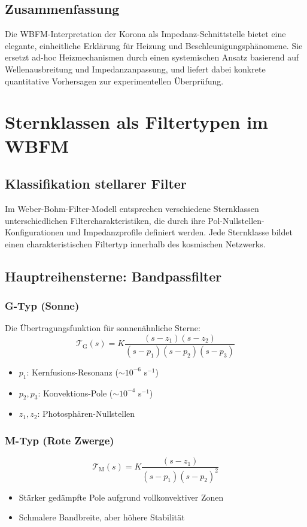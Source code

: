 \section{Zusammenfassung}
Die WBFM-Interpretation der Korona als Impedanz-Schnittstelle bietet eine elegante, einheitliche Erklärung für Heizung und Beschleunigungsphänomene. Sie ersetzt ad-hoc
Heizmechanismen durch einen systemischen Ansatz basierend auf Wellenausbreitung und Impedanzanpassung, und liefert dabei konkrete quantitative Vorhersagen zur experimentellen
Überprüfung.

\chapter{Sternklassen als Filtertypen im WBFM}

\section{Klassifikation stellarer Filter}

Im Weber-Bohm-Filter-Modell entsprechen verschiedene Sternklassen unterschiedlichen Filtercharakteristiken, die durch ihre Pol-Nullstellen-Konfigurationen und Impedanzprofile definiert werden. Jede Sternklasse bildet einen charakteristischen Filtertyp innerhalb des kosmischen Netzwerks.

\section{Hauptreihensterne: Bandpassfilter}

\subsection{G-Typ (Sonne)}
Die Übertragungsfunktion für sonnenähnliche Sterne:
\[
\mathcal{T}_{\text{G}}(s) = K\frac{(s - z_1)(s - z_2)}{(s - p_1)(s - p_2)(s - p_3)}
\]
\begin{itemize}
\item $p_1$: Kernfusions-Resonanz ($\sim 10^{-6}$ s$^{-1}$)
\item $p_2, p_3$: Konvektions-Pole ($\sim 10^{-4}$ s$^{-1}$)
\item $z_1, z_2$: Photosphären-Nullstellen
\end{itemize}

\subsection{M-Typ (Rote Zwerge)}
\[
\mathcal{T}_{\text{M}}(s) = K\frac{(s - z_1)}{(s - p_1)(s - p_2)^2}
\]
\begin{itemize}
\item Stärker gedämpfte Pole aufgrund vollkonvektiver Zonen
\item Schmalere Bandbreite, aber höhere Stabilität
\end{itemize}

